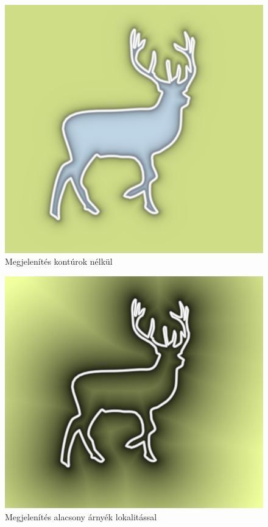 \begin{figure}[H]
    \centering
    \includegraphics[width=0.78\linewidth]{images/hidden_contours.png}
    \caption{Megjelenítés kontúrok nélkül}
    \label{fig:hidden_contours-1}
\end{figure}

\begin{figure}[H]
    \centering
    \includegraphics[width=0.78\linewidth]{images/low_shadow_locality.png}
    \caption{Megjelenítés alacsony árnyék lokalitással}
    \label{fig:low_shadow_locality-1}
\end{figure}

